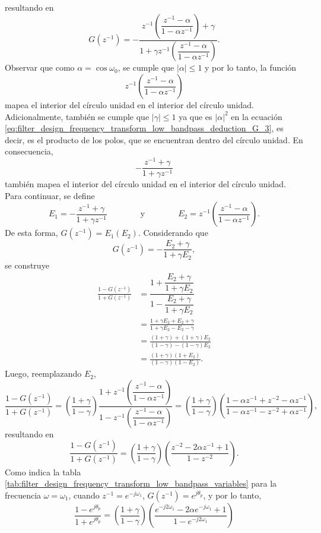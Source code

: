 \documentclass[a4paper]{report}
\begin{document}
resultando en
\[
 G(z^{-1})=-\dfrac{z^{-1}\left(\dfrac{z^{-1}-\alpha}{1-\alpha z^{-1}}\right)+\gamma}{1+\gamma z^{-1}\left(\dfrac{z^{-1}-\alpha}{1-\alpha z^{-1}}\right)}. 
\]
Observar que como \(\alpha=\cos\omega_0\), se cumple que \(|\alpha|\leq1\) y por lo tanto, la función
\[
 z^{-1}\left(\dfrac{z^{-1}-\alpha}{1-\alpha z^{-1}}\right)
\]
mapea el interior del círculo unidad en el interior del círculo unidad. Adicionalmente, también se cumple que \(|\gamma|\leq1\) ya que es \(|\alpha|^2\) en la ecuación \ref{eq:filter_design_frequency_transform_low_bandpass_deduction_G_3}, es decir, es el producto de los polos, que se encuentran dentro del círculo unidad. En consecuencia,
\[
 -\frac{z^{-1}+\gamma}{1+\gamma z^{-1}}
\]
también mapea el interior del círculo unidad en el interior del círculo unidad. Para continuar, se define
\[
 E_1=-\frac{z^{-1}+\gamma}{1+\gamma z^{-1}}
 \qquad\qquad\textrm{y}\qquad\qquad
 E_2=z^{-1}\left(\dfrac{z^{-1}-\alpha}{1-\alpha z^{-1}}\right).
\]
De esta forma, \(G(z^{-1})=E_1(E_2)\). Considerando que 
\[
 G(z^{-1})=-\frac{E_2+\gamma}{1+\gamma E_2},
\]
se construye
\begin{align*}
 \frac{1-G(z^{-1})}{1+G(z^{-1})}&=\dfrac{1+\dfrac{E_2+\gamma}{1+\gamma E_2}}{1-\dfrac{E_2+\gamma}{1+\gamma E_2}}\\
  &=\frac{1+\gamma E_2+E_2+\gamma}{1+\gamma E_2-E_2-\gamma}\\
  &=\frac{(1+\gamma)+(1+\gamma)E_2}{(1-\gamma)-(1-\gamma)E_2}\\
  &=\frac{(1+\gamma)(1+E_2)}{(1-\gamma)(1-E_2)}.
\end{align*}
Luego, reemplazando \(E_2\),
\[
 \frac{1-G(z^{-1})}{1+G(z^{-1})}=\left(\frac{1+\gamma}{1-\gamma}\right)\dfrac{1+z^{-1}\left(\dfrac{z^{-1}-\alpha}{1-\alpha z^{-1}}\right)}{1-z^{-1}\left(\dfrac{z^{-1}-\alpha}{1-\alpha z^{-1}}\right)}
  =\left(\frac{1+\gamma}{1-\gamma}\right)\left(\frac{1-\alpha z^{-1}+z^{-2}-\alpha z^{-1}}{1-\alpha z^{-1}-z^{-2}+\alpha z^{-1}}\right),
\]
resultando en
\begin{equation}\label{eq:filter_design_frequency_transform_low_bandpass_deduction_1}
 \frac{1-G(z^{-1})}{1+G(z^{-1})}=\left(\frac{1+\gamma}{1-\gamma}\right)\left(\frac{z^{-2}-2\alpha z^{-1}+1}{1-z^{-2}}\right). 
\end{equation}
Como indica la tabla \ref{tab:filter_design_frequency_transform_low_bandpass_variables} para la frecuencia \(\omega=\omega_1\), cuando \(z^{-1}=e^{-j\omega_1}\), \(G(z^{-1})=e^{j\theta_p}\), y por lo tanto,
\[
 \frac{1-e^{j\theta_p}}{1+e^{j\theta_p}}=\left(\frac{1+\gamma}{1-\gamma}\right)\left(\frac{e^{-j2\omega_1}-2\alpha e^{-j\omega_1}+1}{1-e^{-j2\omega_1}}\right)
\]
\end{document}
